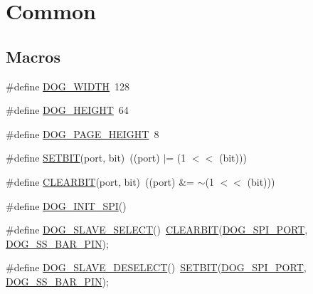\hypertarget{group___d_o_g_m128__common}{\section{Common}
\label{group___d_o_g_m128__common}
}
\subsection*{Macros}
\begin{DoxyCompactItemize}
\item 
\#define \hyperlink{group___d_o_g_m128__common_ga7b8b80428a3dfcea1e2abb255c887e9f}{D\-O\-G\-\_\-\-W\-I\-D\-T\-H}~128
\item 
\#define \hyperlink{group___d_o_g_m128__common_gab4202a8ef333b335e5337d1e4979bca4}{D\-O\-G\-\_\-\-H\-E\-I\-G\-H\-T}~64
\item 
\#define \hyperlink{group___d_o_g_m128__common_ga84cee5ac2871874523ec0f88c59ae82c}{D\-O\-G\-\_\-\-P\-A\-G\-E\-\_\-\-H\-E\-I\-G\-H\-T}~8
\item 
\#define \hyperlink{group___d_o_g_m128__common_ga62e58ee0221736142ba2ff8cacafdb9f}{S\-E\-T\-B\-I\-T}(port, bit)~((port) $|$= (1 $<$$<$ (bit)))
\item 
\#define \hyperlink{group___d_o_g_m128__common_ga8826ffc761710e6313c4c3e3188bfc13}{C\-L\-E\-A\-R\-B\-I\-T}(port, bit)~((port) \&= $\sim$(1 $<$$<$ (bit)))
\item 
\#define \hyperlink{group___d_o_g_m128__common_gacb4f4565c73b548d0dfc34753524c0ff}{D\-O\-G\-\_\-\-I\-N\-I\-T\-\_\-\-S\-P\-I}()
\item 
\#define \hyperlink{group___d_o_g_m128__common_gaad3d69951f6ebd19fb2e26e181cf7bdc}{D\-O\-G\-\_\-\-S\-L\-A\-V\-E\-\_\-\-S\-E\-L\-E\-C\-T}()~\hyperlink{group___d_o_g_m128__common_ga8826ffc761710e6313c4c3e3188bfc13}{C\-L\-E\-A\-R\-B\-I\-T}(\hyperlink{group___d_o_g_m128__user__configuration_gaf9e7124c755de651dd19889cd4304e37}{D\-O\-G\-\_\-\-S\-P\-I\-\_\-\-P\-O\-R\-T}, \hyperlink{group___d_o_g_m128__user__configuration_ga7dc422a18a3abc45c6d2661e22239ed1}{D\-O\-G\-\_\-\-S\-S\-\_\-\-B\-A\-R\-\_\-\-P\-I\-N});
\item 
\#define \hyperlink{group___d_o_g_m128__common_ga5642c965ca96c19a44caef1f2c6faec7}{D\-O\-G\-\_\-\-S\-L\-A\-V\-E\-\_\-\-D\-E\-S\-E\-L\-E\-C\-T}()~\hyperlink{group___d_o_g_m128__common_ga62e58ee0221736142ba2ff8cacafdb9f}{S\-E\-T\-B\-I\-T}(\hyperlink{group___d_o_g_m128__user__configuration_gaf9e7124c755de651dd19889cd4304e37}{D\-O\-G\-\_\-\-S\-P\-I\-\_\-\-P\-O\-R\-T}, \hyperlink{group___d_o_g_m128__user__configuration_ga7dc422a18a3abc45c6d2661e22239ed1}{D\-O\-G\-\_\-\-S\-S\-\_\-\-B\-A\-R\-\_\-\-P\-I\-N});

\end{DoxyCompactItemize}
